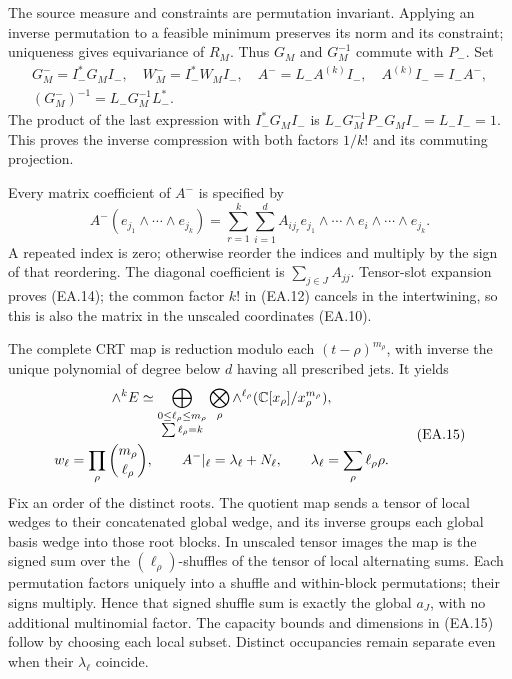 The source measure and constraints are permutation invariant.  Applying
an inverse permutation to a feasible minimum preserves its norm and its
constraint; uniqueness gives equivariance of \(R_M\).  Thus \(G_M\)
and \(G_M^{-1}\) commute with \(P_-\).  Set
\[
 \begin{gathered}
 G_M^-=I_-^*G_MI_-,\quad W_M^-=I_-^*W_MI_-,\quad
 A^-=L_-A^{(k)}I_-,\quad A^{(k)}I_-=I_-A^-,\\
 (G_M^-)^{-1}=L_-G_M^{-1}L_-^*.
 \end{gathered}\tag{EA.13}
\]
The product of the last expression with \(I_-^*G_MI_-\) is
\(L_-G_M^{-1}P_-G_MI_-=L_-I_-=1\).  This proves the inverse
compression with both factors \(1/k!\) and its commuting projection.

Every matrix coefficient of \(A^-\) is specified by
\[
 A^-(e_{j_1}\wedge\cdots\wedge e_{j_k})
 =\sum_{r=1}^k\sum_{i=1}^d A_{i j_r}
       e_{j_1}\wedge\cdots\wedge e_i\wedge\cdots\wedge e_{j_k}.
 \tag{EA.14}
\]
A repeated index is zero; otherwise reorder the indices and multiply
by the sign of that reordering.  The diagonal coefficient is
\(\sum_{j\in J}A_{jj}\).  Tensor-slot expansion proves (EA.14);
the common factor \(k!\) in (EA.12) cancels in the intertwining,
so this is also the matrix in the unscaled coordinates (EA.10).

The complete CRT map is reduction modulo each \((t-\rho)^{m_\rho}\),
with inverse the unique polynomial of degree below \(d\) having all
prescribed jets.  It yields
\[
 \begin{gathered}
 \wedge^k E\simeq
 \bigoplus_{\substack{0\le\ell_\rho\le m_\rho\\\sum\ell_\rho=k}}
             \bigotimes_\rho\wedge^{\ell_\rho}
                           (\mathbb C[x_\rho]/x_\rho^{m_\rho}),\\
 w_\ell=\prod_\rho\binom{m_\rho}{\ell_\rho},\qquad
 A^-|_\ell=\lambda_\ell+N_\ell,\qquad
 \lambda_\ell=\sum_\rho\ell_\rho\rho.
 \end{gathered}\tag{EA.15}
\]
Fix an order of the distinct roots.  The quotient map sends a tensor
of local wedges to their concatenated global wedge, and its inverse
groups each global basis wedge into those root blocks.  In unscaled
tensor images the map is the signed sum over the
\((\ell_\rho)\)-shuffles of the tensor of local alternating sums.
Each permutation factors uniquely into a shuffle and within-block
permutations; their signs multiply.  Hence that signed shuffle sum is
exactly the global \(a_J\), with no additional multinomial factor.
The capacity bounds and dimensions in (EA.15) follow by choosing each
local subset.  Distinct occupancies remain separate even when their
\(\lambda_\ell\) coincide.

